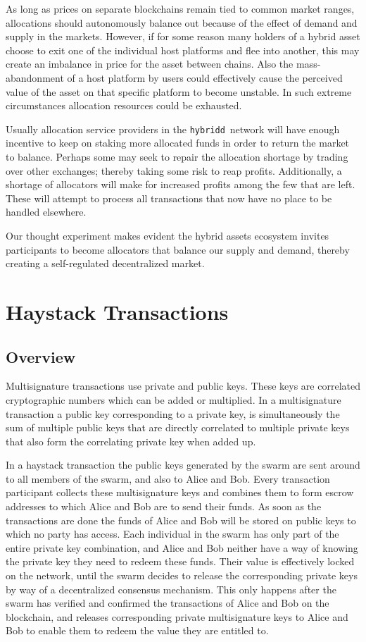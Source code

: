 \documentclass[11pt, a4paper]{article}
\newcommand{\hybridd}{\texttt{hybridd}\, }
\begin{document}
As long as prices on separate blockchains remain tied to common market ranges, allocations should autonomously balance out because of the effect of demand and supply in the markets. However, if for some reason many holders of a hybrid asset choose to exit one of the individual host platforms and flee into another, this may create an imbalance in price for the asset between chains. Also the mass-abandonment of a host platform by users could effectively cause the perceived value of the asset on that specific platform to become unstable. In such extreme circumstances allocation resources could be exhausted.

Usually allocation service providers in the \hybridd network will have enough incentive to keep on staking more allocated funds in order to return the market to balance. Perhaps some may seek to repair the allocation shortage by trading over other exchanges; thereby taking some risk to reap profits. Additionally, a shortage of allocators will make for increased profits among the few that are left. These will attempt to process all transactions that now have no place to be handled elsewhere.

Our thought experiment makes evident the hybrid assets ecosystem invites participants to become allocators that balance our supply and demand, thereby creating a self-regulated decentralized market.


\section{Haystack Transactions}

\subsection{Overview}

Multisignature transactions use private and public keys. These keys are correlated cryptographic numbers which can be added or multiplied. In a multisignature transaction a public key corresponding to a private key, is simultaneously the sum of multiple public keys that are directly correlated to multiple private keys that also form the correlating private key when added up.

In a haystack transaction the public keys generated by the swarm are sent around to all members of the swarm, and also to Alice and Bob. Every transaction participant collects these multisignature keys and combines them to form escrow addresses to which Alice and Bob are to send their funds. As soon as the transactions are done the funds of Alice and Bob will be stored on public keys to which no party has access. Each individual in the swarm has only part of the entire private key combination, and Alice and Bob neither have a way of knowing the private key they need to redeem these funds. Their value is effectively locked on the network, until the swarm decides to release the corresponding private keys by way of a decentralized consensus mechanism. This only happens after the swarm has verified and confirmed the transactions of Alice and Bob on the blockchain, and releases corresponding private multisignature keys to Alice and Bob to enable them to redeem the value they are entitled to.
\end{document}
